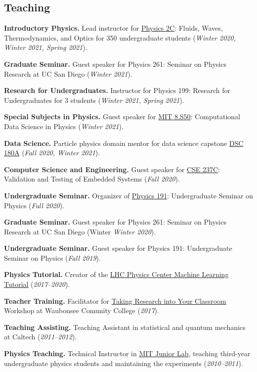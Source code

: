 \documentclass[11pt]{res}
\newcommand{\MarginText}[1]{\section{#1}\vspace{10pt}}
\begin{document}
\begin{resume}
\MarginText{Teaching}


\textbf{Introductory Physics.} Lead instructor for \href{https://jduarte.physics.ucsd.edu/phys2c/index.html}{Physics 2C}: Fluids, Waves, Thermodynamics, and Optics for 350 undergraduate students (\textit{Winter 2020, Winter 2021, Spring 2021}).

\textbf{Graduate Seminar.} Guest speaker for Physics 261: Seminar on Physics Research at UC San Diego (\textit{Winter 2021}).

\textbf{Research for Undergraduates.} Instructor for Physics 199: Research for Undergraduates for 3 students (\textit{Winter 2021, Spring 2021}).

\textbf{Special Subjects in Physics.} Guest speaker for \href{https://github.com/violatingcp/MIT_8.S50}{MIT 8.S50}: Computational Data Science in Physics (\textit{Winter 2021}).

\textbf{Data Science.} Particle physics domain mentor for data science capstone \href{https://jmduarte.github.io/capstone-particle-physics-domain}{DSC 180A} (\textit{Fall 2020, Winter 2021}).

\textbf{Computer Science and Engineering.} Guest speaker for \href{http://kastner.ucsd.edu/ryan/cse237c/}{CSE 237C}: Validation and Testing of Embedded Systems (\textit{Fall 2020}).

\textbf{Undergraduate Seminar.} Organizer of \href{https://indico.cern.ch/event/956641/}{Physics 191}: Undergraduate Seminar on Physics (\textit{Fall 2020}).

\textbf{Graduate Seminar.} Guest speaker for Physics 261: Seminar on Physics Research at UC San Diego (Winter \textit{Winter 2020}).

\textbf{Undergraduate Seminar.} Guest speaker for Physics 191: Undergraduate Seminar on Physics (\textit{Fall 2019}).

\textbf{Physics Tutorial.} Creator of the \href{https://github.com/FNALLPC/machine-learning-hats}{LHC Physics Center Machine Learning Tutorial} (\textit{2017--2020}).

\textbf{Teacher Training.} Facilitator for \href{http://eddata.fnal.gov/lasso/program_search/show_workshopID_new.lasso?event_id=435}{Taking Research into Your Classroom} Workshop at Waubonsee Comunity College (\textit{2017}).

\textbf{Teaching Assisting.} Teaching Assistant in statistical and quantum mechanics at Caltech (\textit{2011--2012}).

\textbf{Physics Teaching.} Technical Instructor in \href{http://web.mit.edu/8.13/www/index.shtml}{MIT Junior Lab}, teaching third-year undergraduate physics students and maintaining the experiments (\textit{2010--2011}).


\end{resume}
\end{document}
